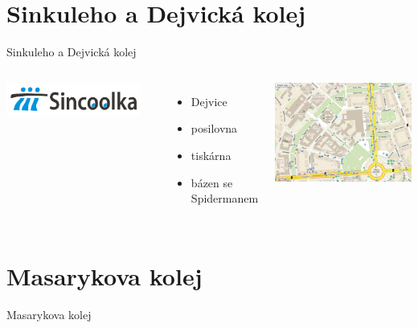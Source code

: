 \documentclass{beamer}
\begin{document}
\section{Sinkuleho a Dejvická kolej}
\begin{frame}{Sinkuleho a Dejvická kolej}
	\begin{columns}[c]
			\begin{center}
				\includegraphics[width=0.9\textwidth]{logo_sin.png}
			\end{center}

			\begin{itemize}
				\item Dejvice
				\item posilovna
				\item tiskárna
				\item bázen se Spidermanem
			\end{itemize}
			\begin{center}
				\includegraphics[width=\textwidth]{mapa_all.png}
			\end{center}
	\end{columns}
\end{frame}


\section{Masarykova kolej}
\begin{frame}{Masarykova kolej}
\end{frame}
\end{document}
